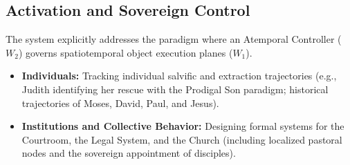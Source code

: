\documentclass[11pt,fleqn]{article}
\begin{document}
\subsection{Activation and Sovereign Control}
The system explicitly addresses the paradigm where an Atemporal Controller ($W_2$) governs spatiotemporal object execution planes ($W_1$).
\begin{itemize}
    \item \textbf{Individuals:} Tracking individual salvific and extraction trajectories (e.g., Judith identifying her rescue with the Prodigal Son paradigm; historical trajectories of Moses, David, Paul, and Jesus).
    \item \textbf{Institutions and Collective Behavior:} Designing formal systems for the Courtroom, the Legal System, and the Church (including localized pastoral nodes and the sovereign appointment of disciples).
\end{itemize}
\end{document}
